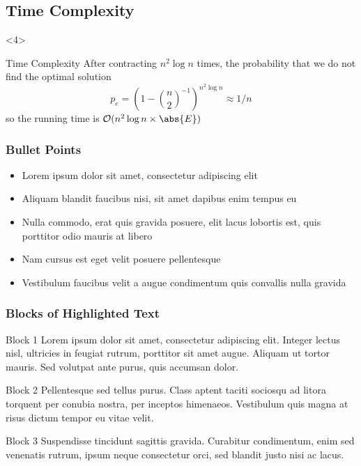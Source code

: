 \documentclass{beamer}
\begin{document}
\begin{frame}
\begin{overlayarea}{\linewidth}{\textheight}
\subsection{Time Complexity}	
\begin{onlyenv}<4>
\begin{block}{Time Complexity}
After contracting $n^2\log{}n$ times, the probability that we do not find the optimal solution
\begin{equation*}
p_e = (1-{\binom n2}^{-1})^{n^2\log{}n} \approx 1/n
\end{equation*}
so the running time is $\mathcal{O}(n^2\log{}n\times \abs{E})$
\end{block}

\end{onlyenv}

\end{overlayarea}

\end{frame}


\begin{frame}
\frametitle{Bullet Points}
\begin{itemize}
	\item Lorem ipsum dolor sit amet, consectetur adipiscing elit
	\item Aliquam blandit faucibus nisi, sit amet dapibus enim tempus eu
	\item Nulla commodo, erat quis gravida posuere, elit lacus lobortis est, quis porttitor odio mauris at libero
	\item Nam cursus est eget velit posuere pellentesque
	\item Vestibulum faucibus velit a augue condimentum quis convallis nulla gravida
\end{itemize}
\end{frame}


\begin{frame}
\frametitle{Blocks of Highlighted Text}
\begin{block}{Block 1}
Lorem ipsum dolor sit amet, consectetur adipiscing elit. Integer lectus nisl, ultricies in feugiat rutrum, porttitor sit amet augue. Aliquam ut tortor mauris. Sed volutpat ante purus, quis accumsan dolor.
\end{block}

\begin{block}{Block 2}
Pellentesque sed tellus purus. Class aptent taciti sociosqu ad litora torquent per conubia nostra, per inceptos himenaeos. Vestibulum quis magna at risus dictum tempor eu vitae velit.
\end{block}

\begin{block}{Block 3}
Suspendisse tincidunt sagittis gravida. Curabitur condimentum, enim sed venenatis rutrum, ipsum neque consectetur orci, sed blandit justo nisi ac lacus.
\end{block}
\end{frame}
\end{document}
